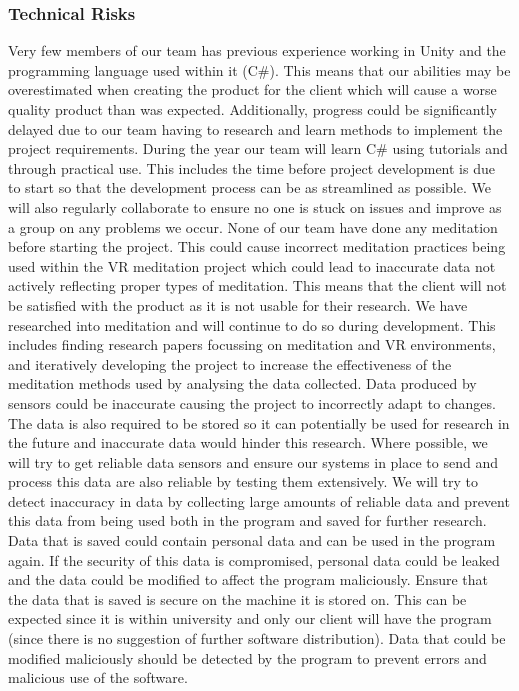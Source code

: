 \documentclass[coverpage,lineno]{../custom}
\begin{document}
\subsubsection{Technical Risks}
{Very few members of our team has previous experience working in Unity and the programming language used within it (C\#). This means that our abilities may be overestimated when creating the product for the client which will cause a worse quality product than was expected. Additionally, progress could be significantly delayed due to our team having to research and learn methods to implement the project requirements.}
{During the year our team will learn C\# using tutorials and through practical use. This includes the time before project development is due to start so that the development process can be as streamlined as possible. We will also regularly collaborate to ensure no one is stuck on issues and improve as a group on any problems we occur.}
{None of our team have done any meditation before starting the project. This could cause incorrect meditation practices being used within the VR meditation project which could lead to inaccurate data not actively reflecting proper types of meditation. This means that the client will not be satisfied with the product as it is not usable for their research.}
{We have researched into meditation and will continue to do so during development. This includes finding research papers focussing on meditation and VR environments, and iteratively developing the project to increase the effectiveness of the meditation methods used by analysing the data collected.}
{Data produced by sensors could be inaccurate causing the project to incorrectly adapt to changes. The data is also required to be stored so it can potentially be used for research in the future and inaccurate data would hinder this research.}
{Where possible, we will try to get reliable data sensors and ensure our systems in place to send and process this data are also reliable by testing them extensively. We will try to detect inaccuracy in data by collecting large amounts of reliable data and prevent this data from being used both in the program and saved for further research.}
{Data that is saved could contain personal data and can be used in the program again. If the security of this data is compromised, personal data could be leaked and the data could be modified to affect the program maliciously.}
{Ensure that the data that is saved is secure on the machine it is stored on. This can be expected since it is within university and only our client will have the program (since there is no suggestion of further software distribution). Data that could be modified maliciously should be detected by the program to prevent errors and malicious use of the software.}
\end{document}
